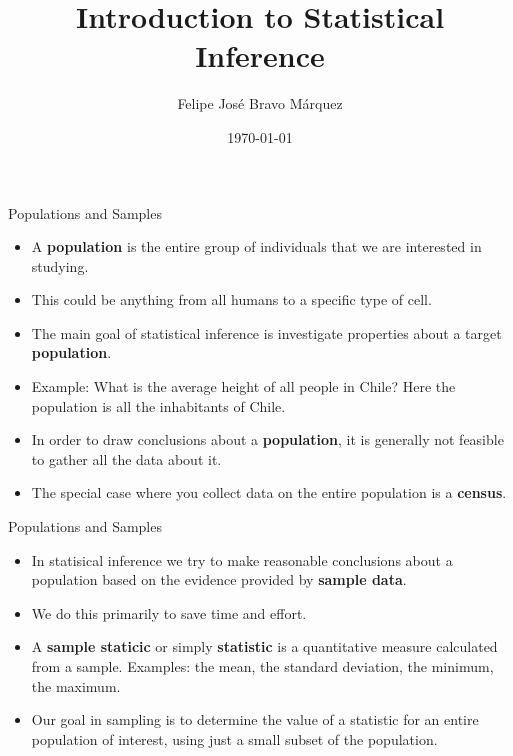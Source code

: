 \documentclass[handout]{beamer}
\title{Introduction to Statistical Inference}
\author[Felipe Bravo Márquez]{\footnotesize
 \textcolor[rgb]{0.00,0.00,1.00}{Felipe José Bravo Márquez}}
\date{ \today }
\begin{document}
\begin{frame}
\titlepage


\end{frame}




\begin{frame}{Populations and Samples}
\scriptsize{
\begin{itemize}
 \item A \textbf{population} is the entire group of individuals that we are interested in studying.
 \item  This could be anything from all humans to a specific type of cell.

\item The main goal of statistical inference is investigate properties about a target \textbf{population}.

 \item Example: What is the average height of all people in Chile? Here the population is all the inhabitants of Chile. 
 
 
 \item In order to draw conclusions about a \textbf{population}, it is generally not feasible to gather all the data about it.
 
 \item The special case where you collect data on the entire population is a \textbf{census}.

\end{itemize}

} 
\end{frame}



\begin{frame}{Populations and Samples}
\scriptsize{
\begin{itemize}
 \item In statisical inference we try to make reasonable conclusions about a population based on the evidence provided by \textbf{sample data}.
 
  \item We do this primarily to save time and effort.
 
 \item A \textbf{sample staticic} or simply \textbf{statistic} is a quantitative measure calculated from a sample. Examples: the mean, the standard deviation, the minimum, the maximum.
 
 
 \item Our goal in sampling is to determine the value of a statistic for an entire population of interest, using just a small subset of the population.
 

 

 
 

\end{itemize}

} 
\end{frame}
\end{document}
